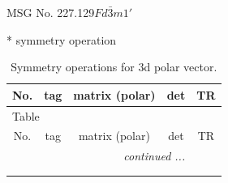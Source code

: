 \documentclass[fleqn,8pt]{jsarticle}
\begin{document}
\setcounter{MaxMatrixCols}{32}

\renewcommand{\tablename}{Table~}
\renewcommand{\figurename}{Figure~}
\begin{center}
\LARGE
MSG No. 227.129\quad$Fd\bar{3}m1'$
\end{center}
* symmetry operation
\renewcommand{\arraystretch}{1.3}
\begin{longtable}{ccccc}
\caption{Symmetry operations for 3d polar vector.}
 \\
 \hline \hline
No. & tag & matrix (polar) & det & TR \\ \hline \endfirsthead

\multicolumn{4}{l}{\tablename\ \thetable{}} \\
 \hline \hline
No. & tag & matrix (polar) & det & TR \\ \hline \endhead

 \hline \hline
\multicolumn{4}{r}{\footnotesize\it continued ...} \\ \endfoot

 \hline \hline
\multicolumn{4}{r}{} \\ \endlastfoot


\end{longtable}
\end{document}
